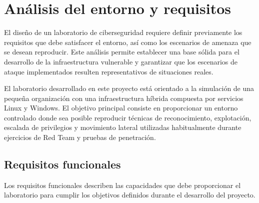 \vspace*{-0.75cm}


\section{Análisis del entorno y requisitos}
\label{sec:analisis_del_entorno_y_requisitos}
\vspace{0.7cm}


El diseño de un laboratorio de ciberseguridad requiere definir previamente los requisitos que debe satisfacer el entorno, así como los escenarios de amenaza que se desean reproducir. Este análisis permite establecer una base sólida para el desarrollo de la infraestructura vulnerable y garantizar que los escenarios de ataque implementados resulten representativos de situaciones reales.

El laboratorio desarrollado en este proyecto está orientado a la simulación de una pequeña organización con una infraestructura híbrida compuesta por servicios Linux y Windows. El objetivo principal consiste en proporcionar un entorno controlado donde sea posible reproducir técnicas de reconocimiento, explotación, escalada de privilegios y movimiento lateral utilizadas habitualmente durante ejercicios de Red Team y pruebas de penetración.

\subsection{Requisitos funcionales}

Los requisitos funcionales describen las capacidades que debe proporcionar el laboratorio para cumplir los objetivos definidos durante el desarrollo del proyecto.


